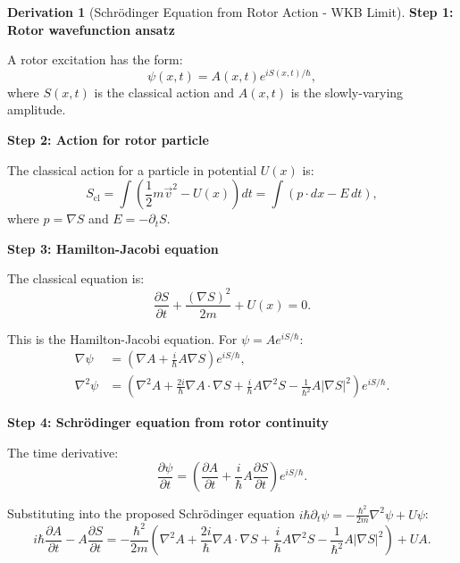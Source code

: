 \documentclass[12pt,a4paper]{article}
\theoremstyle{definition}
\newtheorem{derivation}{Derivation}[section]
\theoremstyle{remark}
\begin{document}
\begin{derivation}[Schrödinger Equation from Rotor Action - WKB Limit]

\textbf{Step 1: Rotor wavefunction ansatz}

A rotor excitation has the form:
\begin{equation}
\psi(x,t) = A(x,t) e^{iS(x,t)/\hbar},
\end{equation}
where $S(x,t)$ is the classical action and $A(x,t)$ is the slowly-varying amplitude.

\textbf{Step 2: Action for rotor particle}

The classical action for a particle in potential $U(x)$ is:
\begin{equation}
S_{\text{cl}} = \int \left(\frac{1}{2}m\vec{v}^2 - U(x)\right) dt = \int (p \cdot dx - E \, dt),
\end{equation}
where $p = \nabla S$ and $E = -\partial_t S$.

\textbf{Step 3: Hamilton-Jacobi equation}

The classical equation is:
\begin{equation}
\frac{\partial S}{\partial t} + \frac{(\nabla S)^2}{2m} + U(x) = 0.
\end{equation}

This is the Hamilton-Jacobi equation. For $\psi = A e^{iS/\hbar}$:
\begin{align}
\nabla \psi &= \left(\nabla A + \frac{i}{\hbar} A \nabla S\right) e^{iS/\hbar}, \\
\nabla^2 \psi &= \left(\nabla^2 A + \frac{2i}{\hbar} \nabla A \cdot \nabla S + \frac{i}{\hbar} A \nabla^2 S - \frac{1}{\hbar^2} A |\nabla S|^2\right) e^{iS/\hbar}.
\end{align}

\textbf{Step 4: Schrödinger equation from rotor continuity}

The time derivative:
\begin{equation}
\frac{\partial \psi}{\partial t} = \left(\frac{\partial A}{\partial t} + \frac{i}{\hbar} A \frac{\partial S}{\partial t}\right) e^{iS/\hbar}.
\end{equation}

Substituting into the proposed Schrödinger equation $i\hbar \partial_t \psi = -\frac{\hbar^2}{2m} \nabla^2 \psi + U\psi$:
\begin{equation}
i\hbar \frac{\partial A}{\partial t} - A \frac{\partial S}{\partial t} = -\frac{\hbar^2}{2m} \left(\nabla^2 A + \frac{2i}{\hbar} \nabla A \cdot \nabla S + \frac{i}{\hbar} A \nabla^2 S - \frac{1}{\hbar^2} A |\nabla S|^2\right) + UA.
\end{equation}


\end{derivation}
\end{document}
